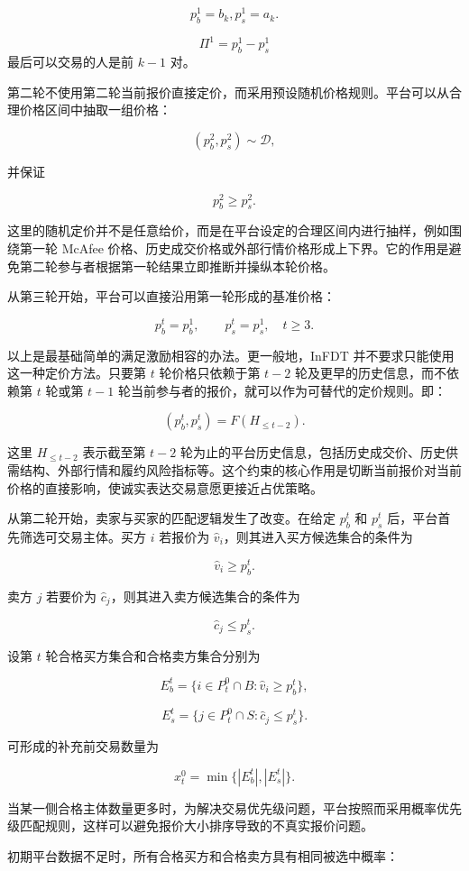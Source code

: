 \documentclass[UTF8,11pt]{ctexart}
\begin{document}
\[
    p_b^1=b_{k},p_s^1=a_{k}.
\]

\[
    \Pi^1=p_b^1-p_s^1
\]
最后可以交易的人是前 \(k-1\) 对。

第二轮不使用第二轮当前报价直接定价，而采用预设随机价格规则。平台可以从合理价格区间中抽取一组价格：

\[
    (p_b^2,p_s^2)\sim \mathcal{D},
\]

并保证

\[
    p_b^2\ge p_s^2.
\]

这里的随机定价并不是任意给价，而是在平台设定的合理区间内进行抽样，例如围绕第一轮 McAfee 价格、历史成交价格或外部行情价格形成上下界。它的作用是避免第二轮参与者根据第一轮结果立即推断并操纵本轮价格。

从第三轮开始，平台可以直接沿用第一轮形成的基准价格：

\[
    p_b^t=p_b^1,\qquad p_s^t=p_s^1,\quad t\ge 3.
\]

以上是最基础简单的满足激励相容的办法。更一般地，InFDT 并不要求只能使用这一种定价方法。只要第 \(t\) 轮价格只依赖于第 \(t-2\) 轮及更早的历史信息，而不依赖第 \(t\) 轮或第 \(t-1\) 轮当前参与者的报价，就可以作为可替代的定价规则。即：

\[
    (p_b^t,p_s^t)=F(H_{\le t-2}).
\]

这里 \(H_{\le t-2}\) 表示截至第 \(t-2\) 轮为止的平台历史信息，包括历史成交价、历史供需结构、外部行情和履约风险指标等。这个约束的核心作用是切断当前报价对当前价格的直接影响，使诚实表达交易意愿更接近占优策略。

从第二轮开始，卖家与买家的匹配逻辑发生了改变。在给定 \(p_b^t\) 和 \(p_s^t\) 后，平台首先筛选可交易主体。买方 \(i\) 若报价为 \(\hat v_i\)，则其进入买方候选集合的条件为

\[
    \hat v_i\ge p_b^t.
\]

卖方 \(j\) 若要价为 \(\hat c_j\)，则其进入卖方候选集合的条件为

\[
    \hat c_j\le p_s^t.
\]

设第 \(t\) 轮合格买方集合和合格卖方集合分别为

\[
    E_b^t=\{i\in P_t^0\cap B:\hat v_i\ge p_b^t\},
\]

\[
    E_s^t=\{j\in P_t^0\cap S:\hat c_j\le p_s^t\}.
\]

可形成的补充前交易数量为

\[
    x_t^0=\min\{|E_b^t|,|E_s^t|\}.
\]

当某一侧合格主体数量更多时，为解决交易优先级问题，平台按照而采用概率优先级匹配规则，这样可以避免报价大小排序导致的不真实报价问题。

初期平台数据不足时，所有合格买方和合格卖方具有相同被选中概率：
\end{document}
